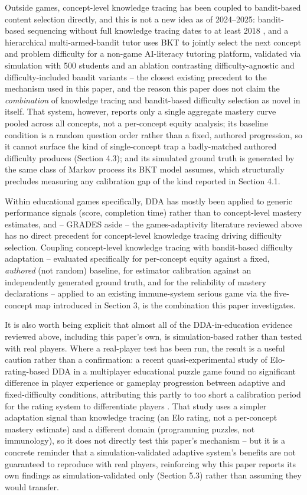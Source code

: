 \documentclass[11pt]{article}
\begin{document}
Outside games, concept-level knowledge tracing has been coupled to bandit-based content selection directly, and this is not a new idea as of 2024--2025: bandit-based sequencing without full knowledge tracing dates to at least 2018 \cite{ref41}, and a hierarchical multi-armed-bandit tutor uses BKT to jointly select the next concept and problem difficulty for a non-game AI-literacy tutoring platform, validated via simulation with 500 students and an ablation contrasting difficulty-agnostic and difficulty-included bandit variants \cite{ref39} -- the closest existing precedent to the mechanism used in this paper, and the reason this paper does not claim the \textit{combination} of knowledge tracing and bandit-based difficulty selection as novel in itself. That system, however, reports only a single aggregate mastery curve pooled across all concepts, not a per-concept equity analysis; its baseline condition is a random question order rather than a fixed, authored progression, so it cannot surface the kind of single-concept trap a badly-matched authored difficulty produces (Section 4.3); and its simulated ground truth is generated by the same class of Markov process its BKT model assumes, which structurally precludes measuring any calibration gap of the kind reported in Section 4.1.

Within educational games specifically, DDA has mostly been applied to generic performance signals (score, completion time) rather than to concept-level mastery estimates, and -- GRADES aside -- the games-adaptivity literature reviewed above has no direct precedent for concept-level knowledge tracing driving difficulty selection. Coupling concept-level knowledge tracing with bandit-based difficulty adaptation -- evaluated specifically for per-concept equity against a fixed, \textit{authored} (not random) baseline, for estimator calibration against an independently generated ground truth, and for the reliability of mastery declarations -- applied to an existing immune-system serious game via the five-concept map introduced in Section 3, is the combination this paper investigates.

It is also worth being explicit that almost all of the DDA-in-education evidence reviewed above, including this paper's own, is simulation-based rather than tested with real players. Where a real-player test has been run, the result is a useful caution rather than a confirmation: a recent quasi-experimental study of Elo-rating-based DDA in a multiplayer educational puzzle game found no significant difference in player experience or gameplay progression between adaptive and fixed-difficulty conditions, attributing this partly to too short a calibration period for the rating system to differentiate players \cite{ref42}. That study uses a simpler adaptation signal than knowledge tracing (an Elo rating, not a per-concept mastery estimate) and a different domain (programming puzzles, not immunology), so it does not directly test this paper's mechanism -- but it is a concrete reminder that a simulation-validated adaptive system's benefits are not guaranteed to reproduce with real players, reinforcing why this paper reports its own findings as simulation-validated only (Section 5.3) rather than assuming they would transfer.
\end{document}
